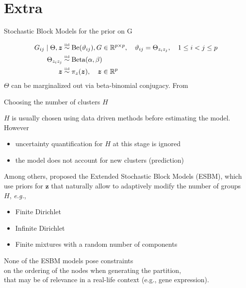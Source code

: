 \section*{Extra}
\begin{frame}{Stochastic Block Models for the prior on G}

\begin{align*}
    G_{ij} \mid \Theta,\bm{z} &\overset{\text{\tiny{iid}}}{\sim} \operatorname{Be}(\vartheta_{ij}),  G \in \mathbb{R}^{p \times p}, \quad \vartheta_{ij} = \Theta_{z_{i}z_{j}}, \quad 1 \le i < j \le p \\ 
    \Theta_{z_{i}z_{j}} &\overset{\text{\tiny{iid}}}{\sim} \operatorname{Beta}(\alpha, \beta)\\
    \bm{z} &\overset{\text{\tiny{iid}}}{\sim} \pi_{z}(\bm{z}), \quad \bm{z} \in \mathbb{R}^p
\end{align*}
$\Theta$ can be marginalized out via beta-binomial conjugacy.
{\scriptsize From \cite{colombiLearningBlockStructured2022a}}
\end{frame}














\begin{frame}{Choosing the number of clusters $H$}

$H$ is usually chosen using data driven methods \alert{before} estimating the model. However
\begin{itemize}
    \item uncertainty quantification for $H$ at this stage is ignored
    \item the model does not account for new clusters (\alert{prediction})
\end{itemize}

Among others, \cite{legramantiExtendedStochasticBlock2022} proposed the \alert{Extended Stochastic Block Models (ESBM)}, which use priors for $\bm{z}$ that naturally allow to adaptively modify the number of groups $H$, \emph{e.g.},
\begin{itemize}
    \item Finite Dirichlet
    \item Infinite Dirichlet
    \item Finite mixtures with a random number of components
\end{itemize}


\begin{center}
    \alert{None of the ESBM models pose constraints\\
    on the ordering of the nodes when generating the partition,\\
    that may be of relevance in a real-life context (e.g., gene expression).} 
\end{center}


\end{frame}